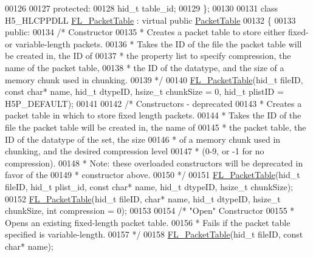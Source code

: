 \begin{DoxyCode}
00126 
00127 \textcolor{keyword}{protected}:
00128     hid\_t table\_id;
00129 \};
00130 
00131 \textcolor{keyword}{class }H5\_HLCPPDLL \hyperlink{class_f_l___packet_table}{FL\_PacketTable} : \textcolor{keyword}{virtual} \textcolor{keyword}{public} \hyperlink{class_packet_table}{PacketTable}
00132 \{
00133 \textcolor{keyword}{public}:
00134     \textcolor{comment}{/* Constructor}
00135 \textcolor{comment}{     * Creates a packet table to store either fixed- or variable-length packets.}
00136 \textcolor{comment}{     * Takes the ID of the file the packet table will be created in, the ID of}
00137 \textcolor{comment}{     * the property list to specify compression, the name of the packet table,}
00138 \textcolor{comment}{     * the ID of the datatype, and the size of a memory chunk used in chunking.}
00139 \textcolor{comment}{     */}
00140     \hyperlink{class_f_l___packet_table}{FL\_PacketTable}(hid\_t fileID, \textcolor{keyword}{const} \textcolor{keywordtype}{char}* name, hid\_t dtypeID, hsize\_t chunkSize = 0, 
      hid\_t plistID = H5P\_DEFAULT);
00141 
00142     \textcolor{comment}{/* Constructors - deprecated}
00143 \textcolor{comment}{     * Creates a packet table in which to store fixed length packets.}
00144 \textcolor{comment}{     * Takes the ID of the file the packet table will be created in, the name of}
00145 \textcolor{comment}{     * the packet table, the ID of the datatype of the set, the size}
00146 \textcolor{comment}{     * of a memory chunk used in chunking, and the desired compression level}
00147 \textcolor{comment}{     * (0-9, or -1 for no compression).}
00148 \textcolor{comment}{     * Note: these overloaded constructors will be deprecated in favor of the}
00149 \textcolor{comment}{     * constructor above.}
00150 \textcolor{comment}{     */}
00151     \hyperlink{class_f_l___packet_table}{FL\_PacketTable}(hid\_t fileID, hid\_t plist\_id, \textcolor{keyword}{const} \textcolor{keywordtype}{char}* name, hid\_t dtypeID, hsize\_t 
      chunkSize);
00152     \hyperlink{class_f_l___packet_table}{FL\_PacketTable}(hid\_t fileID, \textcolor{keywordtype}{char}* name, hid\_t dtypeID, hsize\_t chunkSize, \textcolor{keywordtype}{int} 
      compression = 0);
00153 
00154     \textcolor{comment}{/* "Open" Constructor}
00155 \textcolor{comment}{     * Opens an existing fixed-length packet table.}
00156 \textcolor{comment}{     * Fails if the packet table specified is variable-length.}
00157 \textcolor{comment}{     */}
00158     \hyperlink{class_f_l___packet_table}{FL\_PacketTable}(hid\_t fileID, \textcolor{keyword}{const} \textcolor{keywordtype}{char}* name);

\end{DoxyCode}

